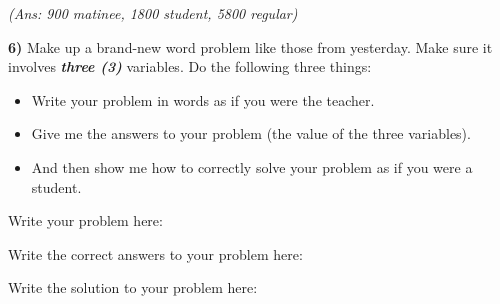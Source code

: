 \documentclass[10pt,letterpaper]{memoir}
\begin{document}
\myWideMatrixTable[-0.1in]

\vspace{0.5in}
\hfill{\itshape (Ans: 900 matinee, 1800 student, 5800 regular)}
\vspace{2em}



\newpage
{\bfseries\large 6)} 
Make up a brand-new word problem like those from yesterday.
Make sure it involves {\bfseries\itshape three (3)} variables.
Do the following three things:
\begin{itemize}[itemsep=0in]
    \item Write your problem in words as if you were the teacher. 
    \item Give me the answers to your problem (the value of the three variables).
    \item And then show me how to correctly solve your problem as if you were a student.
\end{itemize}

Write your problem here:
\vfill

Write the correct answers to your problem here:
\vspace{1in}

Write the solution to your problem here:
\myWideMatrixTable[-0.1in]
\vspace{4em}
\end{document}
